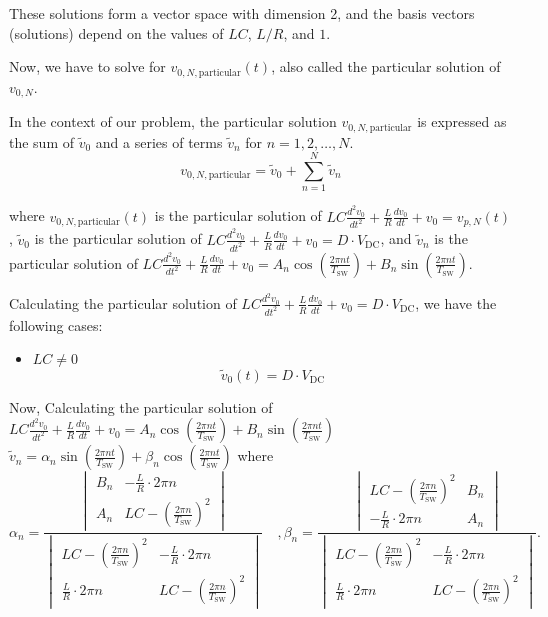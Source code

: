 \documentclass{article}
\begin{document}
These solutions form a vector space with dimension 2, and the basis vectors (solutions) depend on the values of \(LC\), \(L/R\), and \(1\).

Now, we have to solve for \(v_{0,N,\text{particular}}(t)\), also called the particular solution of \(v_{0,N}\).

In the context of our problem, the particular solution \( v_{0,N,\text{particular}} \) is expressed as the sum of \( \widetilde{v}_0 \) and a series of terms \( \widetilde{v}_n \) for \( n = 1, 2, \ldots, N \).
\[ v_{0,N,\text{particular}} = \widetilde{v}_0 + \sum_{n=1}^{N} \widetilde{v}_n \]

where \( {v}_{0,N,\text{particular}}(t) \) is the particular solution of \(LC \frac{d^2 v_0}{dt^2} + \frac{L}{R} \frac{dv_0}{dt} + v_0 = v_{p,N}(t)\), \( \widetilde{v}_0 \) is the particular solution of \(LC \frac{d^2 v_0}{dt^2} + \frac{L}{R} \frac{dv_0}{dt} + v_0 = D \cdot V_{\text{DC}}\), and \( \widetilde{v}_n \) is the particular solution of \(LC \frac{d^2 v_0}{dt^2} + \frac{L}{R} \frac{dv_0}{dt} + v_0 = A_n \cos\left(\frac{2 \pi n t}{T_{\text{SW}}}\right) + B_n \sin\left(\frac{2 \pi n t}{T_{\text{SW}}}\right)\).

Calculating the particular solution of \(LC \frac{d^2 v_0}{dt^2} + \frac{L}{R} \frac{dv_0}{dt} + v_0 = D \cdot V_{\text{DC}}\), we have the following cases:
\begin{itemize}
    \item \(LC \neq 0\)
    \[
        \widetilde{v}
        _{0}(t) = D \cdot V_{\text{DC}}
    \]
\end{itemize}
Now, Calculating the particular solution of \(LC \frac{d^2 v_0}{dt^2} + \frac{L}{R} \frac{dv_0}{dt} + v_0 = A_n \cos\left(\frac{2 \pi n t}{T_{\text{SW}}}\right) + B_n \sin\left(\frac{2 \pi n t}{T_{\text{SW}}}\right)\)\\
$\widetilde{v}_n = \alpha_n\sin\left(\frac{2\pi nt}{T_{\text{SW}}}\right) + \beta_n \cos\left(\frac{2\pi nt}{T_{\text{SW}}}\right)$
where
\[
\alpha_n = \frac
{
\begin{vmatrix}
B_n & -\frac{L}{R}\cdot 2\pi n \\
A_n & LC-\left(\frac{2\pi n}{T_{\text{SW}}}\right)^2
\end{vmatrix}
}
{
\begin{vmatrix}
LC-\left(\frac{2\pi n}{T_{\text{SW}}}\right)^2 & -\frac{L}{R}\cdot 2\pi n \\
\frac{L}{R}\cdot 2\pi n & LC-\left(\frac{2\pi n}{T_{\text{SW}}}\right)^2
\end{vmatrix}   
} \quad,
\beta_n = \frac
{
\begin{vmatrix}
LC-\left(\frac{2\pi n}{T_{\text{SW}}}\right)^2 & B_n \\
-\frac{L}{R}\cdot 2\pi n & A_n
\end{vmatrix}
}
{  
\begin{vmatrix}
LC-\left(\frac{2\pi n}{T_{\text{SW}}}\right)^2 & -\frac{L}{R}\cdot 2\pi n \\
\frac{L}{R}\cdot 2\pi n & LC-\left(\frac{2\pi n}{T_{\text{SW}}}\right)^2
\end{vmatrix}
}.
\]
\end{document}
